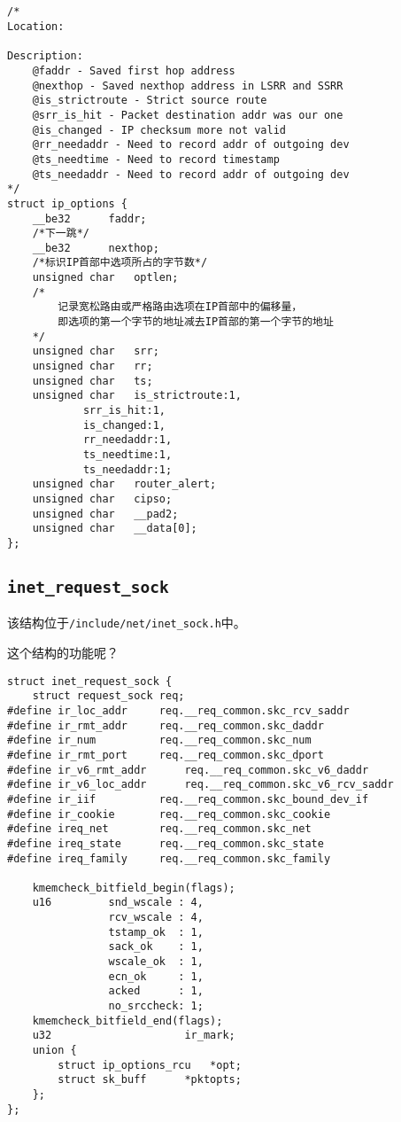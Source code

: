 \begin{verbatim}


/*
Location:

Description:
    @faddr - Saved first hop address
    @nexthop - Saved nexthop address in LSRR and SSRR
    @is_strictroute - Strict source route
    @srr_is_hit - Packet destination addr was our one
    @is_changed - IP checksum more not valid
    @rr_needaddr - Need to record addr of outgoing dev
    @ts_needtime - Need to record timestamp
    @ts_needaddr - Need to record addr of outgoing dev
*/
struct ip_options {
    __be32      faddr;
    /*下一跳*/
    __be32      nexthop;
    /*标识IP首部中选项所占的字节数*/
    unsigned char   optlen;
    /*
        记录宽松路由或严格路由选项在IP首部中的偏移量，
        即选项的第一个字节的地址减去IP首部的第一个字节的地址
    */
    unsigned char   srr;
    unsigned char   rr;
    unsigned char   ts;
    unsigned char   is_strictroute:1,
            srr_is_hit:1,
            is_changed:1,
            rr_needaddr:1,
            ts_needtime:1,
            ts_needaddr:1;
    unsigned char   router_alert;
    unsigned char   cipso;
    unsigned char   __pad2;
    unsigned char   __data[0];
};
\end{verbatim}    
        \subsection{\texttt{inet_request_sock}}

        该结构位于\texttt{/include/net/inet_sock.h}中。

        这个结构的功能呢？

\begin{verbatim}
struct inet_request_sock {
    struct request_sock req;
#define ir_loc_addr     req.__req_common.skc_rcv_saddr
#define ir_rmt_addr     req.__req_common.skc_daddr
#define ir_num          req.__req_common.skc_num
#define ir_rmt_port     req.__req_common.skc_dport
#define ir_v6_rmt_addr      req.__req_common.skc_v6_daddr
#define ir_v6_loc_addr      req.__req_common.skc_v6_rcv_saddr
#define ir_iif          req.__req_common.skc_bound_dev_if
#define ir_cookie       req.__req_common.skc_cookie
#define ireq_net        req.__req_common.skc_net
#define ireq_state      req.__req_common.skc_state
#define ireq_family     req.__req_common.skc_family

    kmemcheck_bitfield_begin(flags);
    u16         snd_wscale : 4,
                rcv_wscale : 4,
                tstamp_ok  : 1,
                sack_ok    : 1,
                wscale_ok  : 1,
                ecn_ok     : 1,
                acked      : 1,
                no_srccheck: 1;
    kmemcheck_bitfield_end(flags);
    u32                     ir_mark;
    union {
        struct ip_options_rcu   *opt;
        struct sk_buff      *pktopts;
    };
};
\end{verbatim}     
